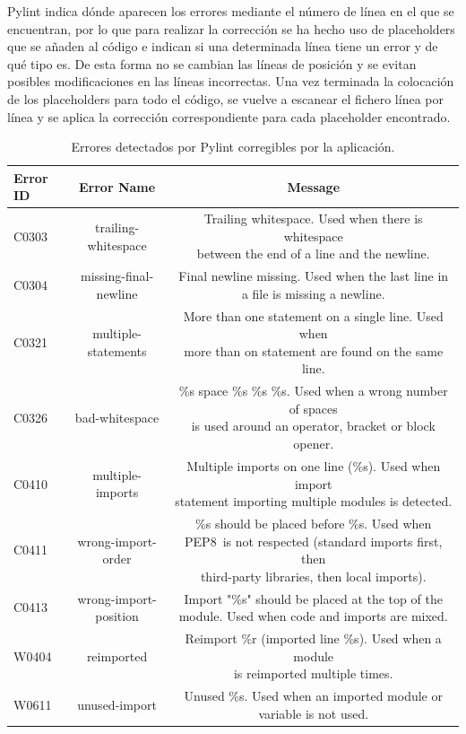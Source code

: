 \documentclass[a4paper, 12pt]{book}
\begin{document}
Pylint indica dónde aparecen los errores mediante el número de línea en el que se encuentran, por lo que para realizar la corrección se ha hecho uso de placeholders que se añaden al código e indican si una determinada línea tiene un error y de qué tipo es.
De esta forma no se cambian las líneas de posición y se evitan posibles modificaciones en las líneas incorrectas.
Una vez terminada la colocación de los placeholders para todo el código, se vuelve a escanear el fichero línea por línea y se aplica la corrección correspondiente para cada placeholder encontrado.
\begin{table}
 \begin{center}
  \begin{tabular}{ | l | c | c |}
    \hline
    \textbf{Error ID} & \textbf{Error Name} & \textbf{Message} \\ \hline
    C0303 & trailing-whitespace & \makecell[l]{Trailing whitespace. Used when there is whitespace\\between the end of a line and the newline.} \\ \hline
    C0304 & missing-final-newline & \makecell[l]{Final newline missing. Used when the last line in\\a file is missing a newline.} \\ \hline
    C0321 & multiple-statements & \makecell[l]{More than one statement on a single line. Used when\\more than on statement are found on the same line.} \\ \hline
    C0326 & bad-whitespace & \makecell[l]{\%s space \%s \%s \%s. Used when a wrong number of spaces\\is used around an operator, bracket or block opener.} \\ \hline
    C0410 & multiple-imports & \makecell[l]{Multiple imports on one line (\%s). Used when import\\statement importing multiple modules is detected.} \\ \hline
    C0411 & wrong-import-order & \makecell[l]{\%s should be placed before \%s. Used when PEP8\ is not respected (standard imports first, then\\third-party libraries, then local imports).} \\ \hline
    C0413 & wrong-import-position & \makecell[l]{Import "\%s" should be placed at the top of the\\module. Used when code and imports are mixed.} \\ \hline
    W0404 & reimported & \makecell[l]{Reimport \%r (imported line \%s). Used when a module\\is reimported multiple times.} \\ \hline
    W0611 & unused-import & \makecell[l]{Unused \%s. Used when an imported module or\\variable is not used.} \\ \hline
  \end{tabular}
  \label{tabla:errores}
  \caption{Errores detectados por Pylint corregibles por la aplicación.}
 \end{center}
\end{table}
\end{document}
